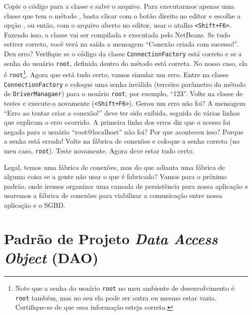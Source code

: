 Copie o código para a classe e salve o arquivo. Para executarmos apenas uma classe que tem o método , basta clicar com o botão direito no editor e escolhe a opção , ou então, com o arquivo aberto no editor, usar o atalho \texttt{<Shift+F6>}. Fazendo isso, a classe vai ser compilada e executada pelo NetBeans. Se tudo estiver correto, você verá na saída a mensagem ``Conexão criada com sucesso!''. Deu erro? Verifique se o código da classe \texttt{ConnectionFactory} está correto e se a senha do usuário \texttt{root}, definida dentro do método  está correta. No nosso caso, ela é \texttt{root}\footnote{Note que a senha do usuário \texttt{root} no meu ambiente de desenvolvimento é \texttt{root} também, mas no seu ela pode ser outra ou mesmo estar vazia. Certifique-se de que essa informação esteja correta.}. Agora que está tudo certo, vamos simular um erro. Entre na classe \texttt{ConnectionFactory} e coloque uma senha inválida (terceiro parâmetro do método  de \texttt{DriverManagaer}) para o usuário \texttt{root}, por exemplo, ``123''. Volte na classe de testes e execute-a novamente (\texttt{<Shift+F6>}). Gerou um erro não foi? A mensagem ``Erro ao tentar criar a conexão!'' deve ter sido exibida, seguida de várias linhas que explicam o erro ocorrido. A primeira linha dos erros diz que o acesso foi negado para o usuário ``root@localhost'' não foi? Por que aconteceu isso? Porque a senha está errada! Volte na fábrica de conexões e coloque a senha correta (no meu caso, \texttt{root}). Teste novamente. Agora deve estar tudo certo.

Legal, temos uma fábrica de conexões, mas do que adianta uma fábrica de alguma coisa se a gente não usar o que é fabricado? Vamos para o próximo padrão, onde iremos organizar uma camada de persistência para nossa aplicação e usaremos a fábrica de conexões para viabilizar a comunicação entre nossa aplicação e o SGBD.


\section{Padrão de Projeto \textit{Data Access Object} (DAO)}

